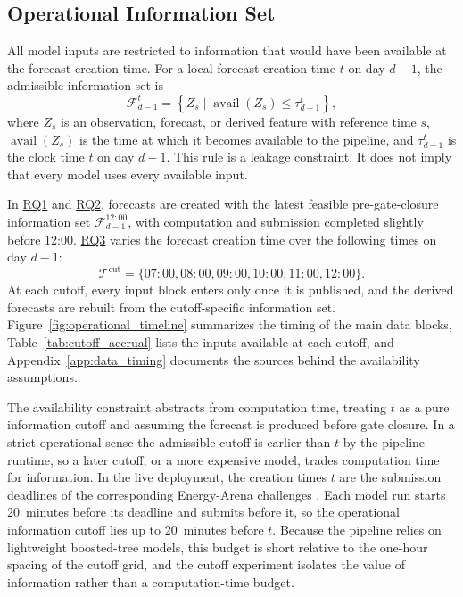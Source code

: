 \subsection{Operational Information Set}
\label{sec:operational_information_set}

All model inputs are restricted to information that would have been available
at the forecast creation time. For a local forecast creation time \(t\) on day
\(d-1\), the admissible information set is
\[
  \mathcal{F}_{d-1}^{t}
  =
  \left\{
    Z_{s} \mid \operatorname{avail}(Z_{s})
    \leq \tau_{d-1}^{t}
  \right\},
\]
where \(Z_{s}\) is an observation, forecast, or derived feature with reference
time \(s\), \(\operatorname{avail}(Z_{s})\) is the time at which it becomes
available to the pipeline, and \(\tau_{d-1}^{t}\) is the clock time \(t\) on day
\(d-1\). This rule is a
leakage constraint. It does not imply that every model uses every available
input.

In \hyperlink{rq:component_forecast_quality}{RQ1} and
\hyperlink{rq:price_impact_generated_forecasts}{RQ2}, forecasts are created with the
latest feasible pre-gate-closure information set
\(\mathcal{F}_{d-1}^{12:00}\), with computation and submission completed
slightly before 12:00. \hyperlink{rq:cutoff_sensitivity}{RQ3}
varies the forecast creation time over the following times on day
\(d-1\):
\[
  \mathcal{T}^{\mathrm{cut}}
  =
  \{07{:}00,08{:}00,09{:}00,10{:}00,11{:}00,12{:}00\}.
\]
At each cutoff, every input block enters only once it is published, and the
derived forecasts are rebuilt from the cutoff-specific information set.
Figure~\ref{fig:operational_timeline} summarizes the timing of the main data
blocks, Table~\ref{tab:cutoff_accrual} lists the inputs available at each
cutoff, and Appendix~\ref{app:data_timing} documents the sources behind the
availability assumptions.

The availability constraint abstracts from computation time, treating \(t\) as a
pure information cutoff and assuming the forecast is produced before gate
closure. In a strict operational sense the admissible cutoff is earlier than
\(t\) by the pipeline runtime, so a later cutoff, or a more expensive model,
trades computation time for information. In the live deployment, the creation
times \(t\) are the submission deadlines of the corresponding Energy-Arena
challenges \cite{kleinebrahm2026energyarena}. Each model run starts 20~minutes
before its deadline and submits before it, so the operational information cutoff
lies up to 20~minutes before \(t\). Because the pipeline relies on lightweight
boosted-tree models, this budget is short relative to the one-hour spacing of the
cutoff grid, and the cutoff experiment isolates the value of information rather
than a computation-time budget.

